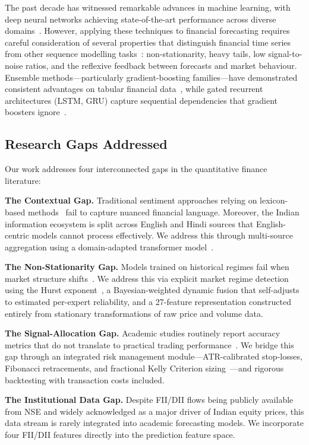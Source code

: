 \documentclass[10pt,a4paper,twoside]{article}
\begin{document}
The past decade has witnessed remarkable advances in machine learning, with deep
neural networks achieving state-of-the-art performance across diverse
domains~\cite{lecun2015}. However, applying these techniques to financial
forecasting requires careful consideration of several properties that
distinguish financial time series from other sequence modelling
tasks~\cite{lopez2018}: non-stationarity, heavy tails, low signal-to-noise
ratios, and the reflexive feedback between forecasts and market behaviour.
Ensemble methods---particularly gradient-boosting families---have demonstrated
consistent advantages on tabular financial data~\cite{grinsztajn2022}, while
gated recurrent architectures (LSTM, GRU) capture sequential dependencies that
gradient boosters ignore~\cite{hochreiter1997,cho2014}.

\subsection{Research Gaps Addressed}

Our work addresses four interconnected gaps in the quantitative finance
literature:

\textbf{The Contextual Gap.} Traditional sentiment approaches relying on
lexicon-based methods~\cite{loughran2011} fail to capture nuanced financial
language. Moreover, the Indian information ecosystem is split across English and
Hindi sources that English-centric models cannot process effectively. We address
this through multi-source aggregation using a domain-adapted transformer
model~\cite{araci2019}.

\textbf{The Non-Stationarity Gap.} Models trained on historical regimes fail
when market structure shifts~\cite{hamilton1989}. We address this via explicit
market regime detection using the Hurst exponent~\cite{hurst1951}, a
Bayesian-weighted dynamic fusion that self-adjusts to estimated per-expert
reliability, and a 27-feature representation constructed entirely from
stationary transformations of raw price and volume data.

\textbf{The Signal-Allocation Gap.} Academic studies routinely report accuracy
metrics that do not translate to practical trading
performance~\cite{lopez2018}. We bridge this gap through an integrated risk
management module---ATR-calibrated stop-losses, Fibonacci retracements, and
fractional Kelly Criterion sizing~\cite{kelly1956}---and rigorous backtesting
with transaction costs included.

\textbf{The Institutional Data Gap.} Despite FII/DII flows being publicly
available from NSE and widely acknowledged as a major driver of Indian equity
prices, this data stream is rarely integrated into academic forecasting
models. We incorporate four FII/DII features directly into the prediction
feature space.
\end{document}
